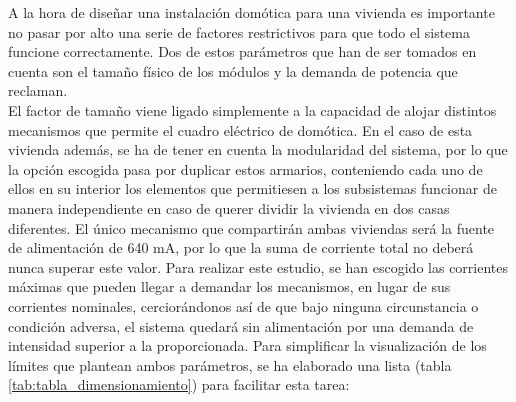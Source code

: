 A la hora de diseñar una instalación domótica para una vivienda es importante no pasar por alto una serie de factores restrictivos para que todo el sistema funcione correctamente. Dos de estos parámetros que han de ser tomados en cuenta son el tamaño físico de los módulos y la demanda de potencia que reclaman.\\
 El factor de tamaño viene ligado simplemente a la capacidad de alojar distintos mecanismos que permite el cuadro eléctrico de domótica. En el caso de esta vivienda además, se ha de tener en cuenta la modularidad del sistema, por lo que la opción escogida pasa por duplicar estos armarios, conteniendo cada uno de ellos en su interior los elementos que permitiesen a los subsistemas funcionar de manera independiente en caso de querer dividir la vivienda en dos casas diferentes. El único mecanismo que compartirán ambas viviendas será la fuente de alimentación de 640 mA, por lo que la suma de corriente total no deberá nunca superar este valor. Para realizar este estudio, se han escogido las corrientes máximas que pueden llegar a demandar los mecanismos, en lugar de sus corrientes nominales, cerciorándonos así de que bajo ninguna circunstancia o condición adversa, el sistema quedará sin alimentación por una demanda de intensidad superior a la proporcionada. Para simplificar la visualización de los límites que plantean ambos parámetros, se ha elaborado una lista (tabla \ref{tab:tabla_dimensionamiento}) para facilitar esta tarea:

